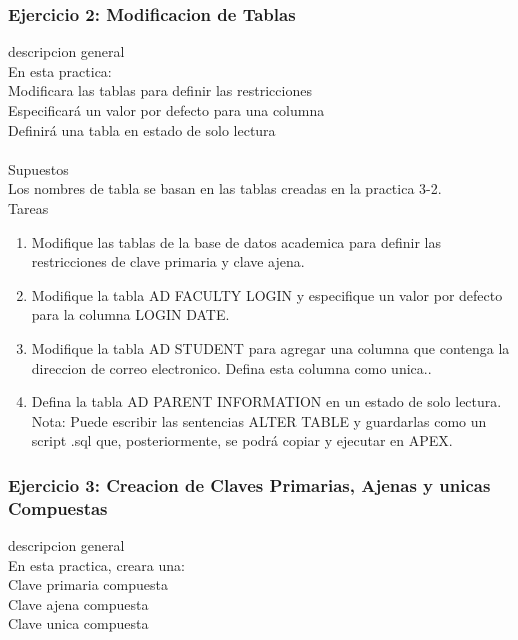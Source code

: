 \documentclass[12pt,letterpaper]{article}
\begin{document}
		
		\subsubsection{Ejercicio 2: Modificacion de Tablas} 
descripcion general  \\
En esta practica:\\
Modificara las tablas para definir las restricciones\\
Especificará un valor por defecto para una columna\\
Definirá una tabla en estado de solo lectura\\
 \\
Supuestos\\
Los nombres de tabla se basan en las tablas creadas en la practica 3-2.\\


Tareas\\
\begin{enumerate}[1.]
    \item  Modifique las tablas de la base de datos academica para definir las restricciones de clave primaria y clave ajena.  
     
    \item Modifique la tabla AD FACULTY LOGIN y especifique un valor por defecto para la columna LOGIN DATE.
    
    \item Modifique la tabla AD STUDENT para agregar una columna que contenga la direccion de correo electronico. Defina esta columna como unica..
    
    \item Defina la tabla AD PARENT INFORMATION en un estado de solo lectura.\\
    Nota: Puede escribir las sentencias ALTER TABLE y guardarlas como un script .sql que, posteriormente, se podrá copiar y ejecutar en APEX.
    
    
		\end{enumerate} 
		
	
	
	\subsubsection{Ejercicio 3: Creacion de Claves Primarias, Ajenas y unicas Compuestas} 
descripcion general  \\
En esta practica, creara una:\\
Clave primaria compuesta\\
Clave ajena compuesta\\
Clave unica compuesta\\
 \\
\end{document}
